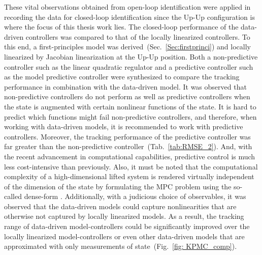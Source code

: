 These vital observations obtained from open-loop identification were applied in recording the data for closed-loop identification since the Up-Up configuration is where the focus of this thesis work lies. The closed-loop performance of the data-driven controllers was compared to that of the locally linearized controllers. To this end, a first-principles model was derived~(Sec.~\ref{Sec:firstprinci}) and locally linearized by Jacobian linearization at the Up-Up position. Both a non-predictive controller such as the linear quadratic regulator and a predictive controller such as the model predictive controller were synthesized to compare the tracking performance in combination with the data-driven model. It was observed that non-predictive controllers do not perform as well as predictive controllers when the state is augmented with certain nonlinear functions of the state. It is hard to predict which functions might fail non-predictive controllers, and therefore, when working with data-driven models, it is recommended to work with predictive controllers. Moreover, the tracking performance of the predictive controller was far greater than the non-predictive controller~(Tab.~\ref{tab:RMSE_2}). And, with the recent advancement in computational capabilities, predictive control is much less cost-intensive than previously. Also, it must be noted that the computational complexity of a high-dimensional lifted system is rendered virtually independent of the dimension of the state by formulating the MPC problem using the so-called dense-form \cite{MPC_Korda}. Additionally, with a judicious choice of observables, it was observed that the data-driven models could capture nonlinearities that are otherwise not captured by locally linearized models. As a result, the tracking range of data-driven model-controllers could be significantly improved over the locally linearized model-controllers or even other data-driven models that are approximated with only measurements of state~(Fig.~\ref{fig: KPMC_comp}).\newpage
